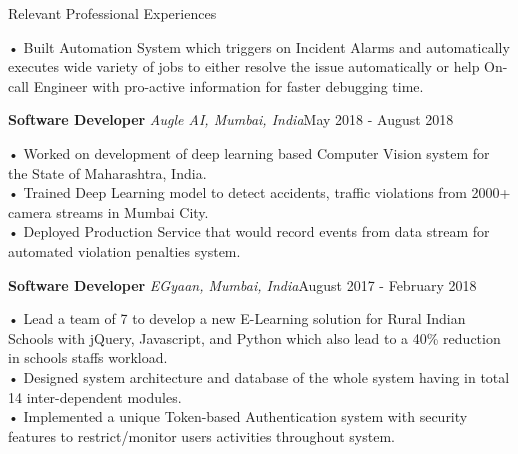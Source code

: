 \documentclass{resume} %
\begin{document}
\begin{rSection}{Relevant Professional Experiences}
\begin{addmargin}[0.5em]{0em}
• Built Automation System which triggers on Incident Alarms and automatically executes wide variety of jobs to either resolve the issue automatically or help On-call Engineer with pro-active information for faster debugging time. \\
\end{addmargin} \vspace{-1.7em}
\textbf{Software Developer } \textit{Augle AI, Mumbai, India}\hfill May 2018 - August 2018 \\
\vspace{-1.7em} \begin{addmargin}[0.5em]{0em}
• Worked on development of deep learning based Computer Vision system for the State of Maharashtra, India.\\
• Trained Deep Learning model to detect accidents, traffic violations from 2000+ camera streams in Mumbai City. \\
• Deployed Production Service that would record events from data stream for automated violation penalties system.\\
\end{addmargin} \vspace{-1.7em}
\textbf{Software Developer } \textit{EGyaan, Mumbai, India}\hfill August 2017 - February 2018 \\
\vspace{-1.7em} \begin{addmargin}[0.5em]{0em}
• Lead a team of 7 to develop a new E-Learning solution for Rural Indian Schools with jQuery, Javascript, and Python which also lead to a 40\% reduction in schools staffs workload. \\
• Designed system architecture and database of the whole system having in total 14 inter-dependent modules.\\
• Implemented a unique Token-based Authentication system with security features to restrict/monitor users activities throughout system. \\
\end{addmargin} 
\end{rSection} 
\end{document}
